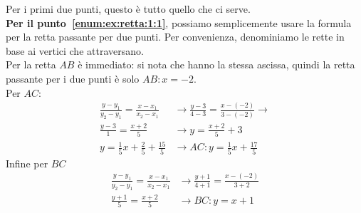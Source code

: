 Per i primi due punti, questo è tutto quello che ci serve.\\
\textbf{Per il punto~\ref{enum:ex:retta:1:1}}, possiamo semplicemente usare la formula per la retta 
passante per due punti. Per convenienza, denominiamo le rette in base ai vertici che attraversano.\\
Per la retta $AB$ è immediato: si nota che hanno la stessa ascissa, quindi la retta passante per i due
punti è solo $\boxed{AB: x = -2}$.\\ [\baselineskip]
Per $AC$:
\begin{align*}
\frac{y-y_1}{y_2-y_1} = \frac{x-x_1}{x_2-x_1} &\rightarrow
\frac{y-3}{4-3} = \frac{x-(-2)}{3-(-2)} \rightarrow\\
\frac{y-3}{1} = \frac{x+2}{5} &\rightarrow y = \frac{x+2}{5} + 3\\
y = \frac{1}{5}x + \frac{2}{5} + \frac{15}{5} &\rightarrow \boxed{AC: y = \frac{1}{5}x + \frac{17}{5}}
\end{align*}
Infine per $BC$
\begin{align*}
\frac{y-y_1}{y_2-y_1} = \frac{x-x_1}{x_2-x_1} &\rightarrow
\frac{y+1}{4+1} = \frac{x-(-2)}{3+2}\\
\frac{y+1}{5} = \frac{x+2}{5} &\rightarrow \boxed{BC: y = x + 1}
\end{align*}

